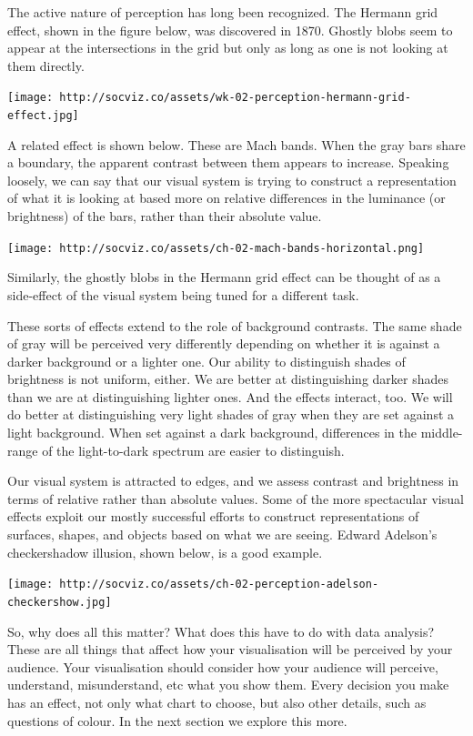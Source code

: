 \documentclass[
]{book}
\begin{document}
The active nature of perception has long been recognized. The Hermann grid effect, shown in the figure below, was discovered in 1870. Ghostly blobs seem to appear at the intersections in the grid but only as long as one is not looking at them directly.

\texttt{[image: http://socviz.co/assets/wk-02-perception-hermann-grid-effect.jpg]}

A related effect is shown below. These are Mach bands. When the gray bars share a boundary, the apparent contrast between them appears to increase. Speaking loosely, we can say that our visual system is trying to construct a representation of what it is looking at based more on relative differences in the luminance (or brightness) of the bars, rather than their absolute value.

\texttt{[image: http://socviz.co/assets/ch-02-mach-bands-horizontal.png]}

Similarly, the ghostly blobs in the Hermann grid effect can be thought of as a side-effect of the visual system being tuned for a different task.

These sorts of effects extend to the role of background contrasts. The same shade of gray will be perceived very differently depending on whether it is against a darker background or a lighter one. Our ability to distinguish shades of brightness is not uniform, either. We are better at distinguishing darker shades than we are at distinguishing lighter ones. And the effects interact, too. We will do better at distinguishing very light shades of gray when they are set against a light background. When set against a dark background, differences in the middle-range of the light-to-dark spectrum are easier to distinguish.

Our visual system is attracted to edges, and we assess contrast and brightness in terms of relative rather than absolute values. Some of the more spectacular visual effects exploit our mostly successful efforts to construct representations of surfaces, shapes, and objects based on what we are seeing. Edward Adelson's checkershadow illusion, shown below, is a good example.

\texttt{[image: http://socviz.co/assets/ch-02-perception-adelson-checkershow.jpg]}

So, why does all this matter? What does this have to do with data analysis? These are all things that affect how your visualisation will be perceived by your audience. Your visualisation should consider how your audience will perceive, understand, misunderstand, etc what you show them. Every decision you make has an effect, not only what chart to choose, but also other details, such as questions of colour. In the next section we explore this more.
\end{document}

